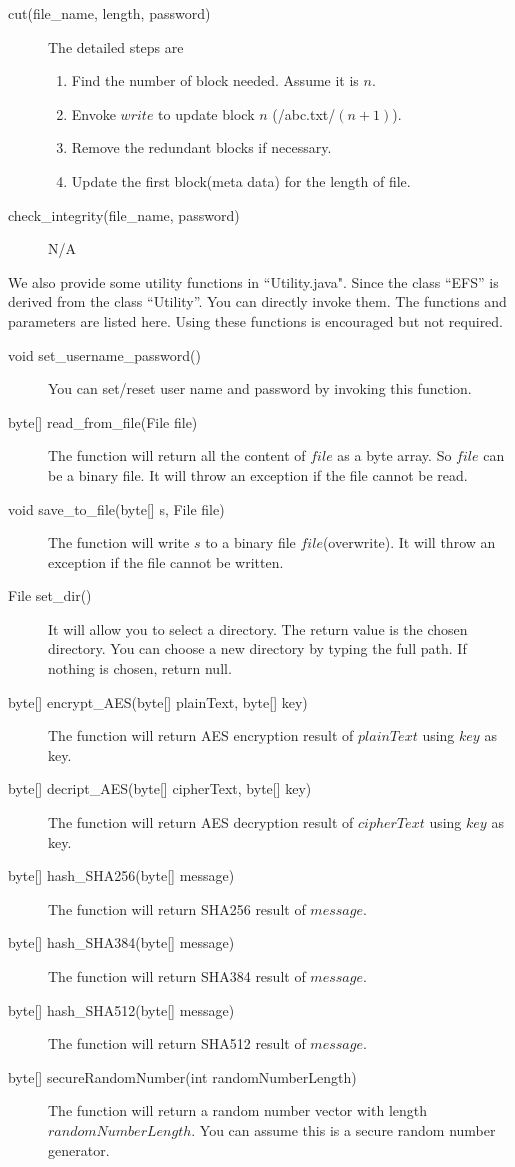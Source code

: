 \documentclass[11pt]{article}
\begin{document}
\begin{description}
 \item[cut(file\_name, length, password)]
    The detailed steps are

    \begin{enumerate}
        \item Find the number of block needed. Assume it is $n$.
        \item Envoke $write$ to update block $n$ (/abc.txt/$(n+1)$).
        \item Remove the redundant blocks if necessary.
        \item Update the first block(meta data) for the length of file.
    \end{enumerate}

 \item[check\_integrity(file\_name, password)]
N/A
\end{description}

We also provide some utility functions in ``Utility.java". Since the class ``EFS'' is derived from the class ``Utility''. You can directly invoke them. The functions and parameters are listed here. Using these functions is encouraged but not required.

\begin{description}
    \item [void set\_username\_password()] You can set/reset user name and password by invoking this function.
    \item [byte{[]} read\_from\_file(File file)] The function will return all the content of $file$ as a byte array. So $file$ can be a binary file. It will throw an exception if the file cannot be read.
    \item [void save\_to\_file(byte{[]} s, File file)] The function will write $s$ to a binary file $file$(overwrite). It will throw an exception if the file cannot be written.
    \item [File set\_dir()] It will allow you to select a directory. The return value is the chosen directory. You can choose a new directory by typing the full path. If nothing is chosen, return null.
    \item [byte{[]} encrypt\_AES(byte{[]} plainText, byte{[]} key)] The function will return AES encryption result of $plainText$ using $key$ as key.
    \item [byte{[]} decript\_AES(byte{[]} cipherText, byte{[]} key)] The function will return AES decryption result of $cipherText$ using $key$ as key.
    \item [byte{[]} hash\_SHA256(byte{[]} message)] The function will return SHA256 result of $message$.
    \item [byte{[]} hash\_SHA384(byte{[]} message)] The function will return SHA384 result of $message$.
    \item [byte{[]} hash\_SHA512(byte{[]} message)] The function will return SHA512 result of $message$.
    \item [byte{[]} secureRandomNumber(int randomNumberLength)] The function will return a random number vector with length $randomNumberLength$. You can assume this is a secure random number generator.
\end{description}
\end{document}
